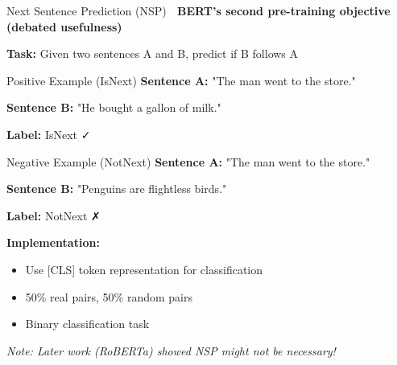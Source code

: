 \documentclass[aspectratio=169]{beamer}
\begin{document}
\begin{frame}{Next Sentence Prediction (NSP) 🔗}
\textbf{BERT's second pre-training objective (debated usefulness)}

\vspace{1em}

\textbf{Task:} Given two sentences A and B, predict if B follows A

\vspace{1em}

\begin{exampleblock}{Positive Example (IsNext)}
\textbf{Sentence A:} "The man went to the store."

\textbf{Sentence B:} "He bought a gallon of milk."

\textbf{Label:} IsNext ✓
\end{exampleblock}

\vspace{0.5em}

\begin{alertblock}{Negative Example (NotNext)}
\textbf{Sentence A:} "The man went to the store."

\textbf{Sentence B:} "Penguins are flightless birds."

\textbf{Label:} NotNext ✗
\end{alertblock}

\vspace{1em}

\textbf{Implementation:}
\begin{itemize}\setlength{\itemsep}{0pt}
    \item Use [CLS] token representation for classification
    \item 50\% real pairs, 50\% random pairs
    \item Binary classification task
\end{itemize}

\vspace{0.5em}
\textit{Note: Later work (RoBERTa) showed NSP might not be necessary!}
\end{frame}
\end{document}
